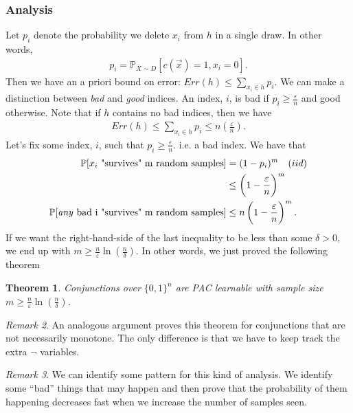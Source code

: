 \documentclass[12pt, letterpaper]{article}
\numberwithin{equation}{section} %
\newcommand{\mb}{\mathbb}
\newcommand{\ve}{\varepsilon}
\newtheorem{theorem}{Theorem}[section]
\theoremstyle{definition}
\theoremstyle{remark}
\newtheorem{remark}[theorem]{Remark}
\begin{document}
\subsubsection*{Analysis}

Let $p_i$ denote the probability we delete $x_i$ from $h$ in a single draw. In other words,
\begin{align}
    p_i = \mb P_{\bar X\sim D}[c(\vec x) = 1, x_i=0].
\end{align}
Then we have an a priori bound on error: $Err(h) \leq \sum\limits_{x_i\in h} p_i$.
 We can make a distinction between \emph{bad} and \emph{good} indices.
 An index, $i$, is bad if $p_i\geq \frac{\ve}{n}$ and good otherwise.
 Note that if $h$ contains no bad indices, then we have
\begin{align}
    Err(h) \leq \sum\limits_{x_i\in h} p_i \leq n\left(\frac{\ve}{n}\right).
\end{align}
Let's fix some index, $i$, such that $p_i\geq \frac\ve n$. i.e. a bad index. We have that
\begin{align}
    \mb P[x_i\textrm{ "survives" m random samples}] &= (1 - p_i)^m \quad (iid)\\
    & \leq \left(1 - \frac\ve n\right)^m \\
    \mb P[\textrm{\emph{any} bad i "survives" m random samples}] &\leq n\left(1 - \frac\ve n\right)^m.
\end{align}
If we want the right-hand-side of the last inequality to be less than some $\delta>0$, we end up with $m \geq \frac n\ve \ln\left(\frac n\delta\right)$.
In other words, we just proved the following theorem

\begin{theorem}
    Conjunctions over $\lbrace 0,1 \rbrace^n$ are PAC learnable with sample size  $m \geq \frac n\ve \ln\left(\frac n\delta\right)$.
\end{theorem}

\begin{remark}
    An analogous argument proves this theorem for conjunctions that are not necessarily monotone.
    The only difference is that we have to keep track the extra $\lnot$ variables.
\end{remark}

\begin{remark}
    We can identify some pattern for this kind of analysis.
    We identify some ``bad'' things that may happen and then prove that the probability of them happening decreases fast when we increase the number of samples seen.
\end{remark}
\end{document}
